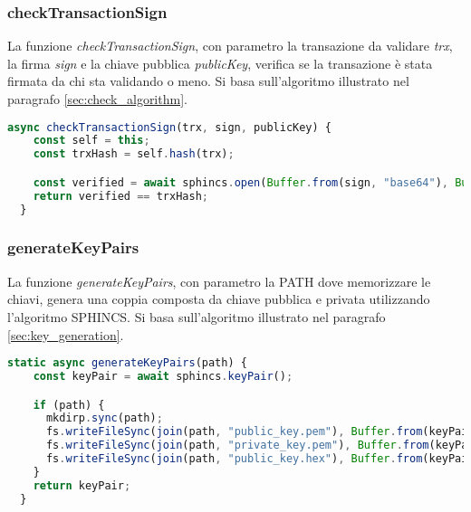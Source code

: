 \subsubsection{checkTransactionSign}
La funzione \textit{checkTransactionSign}, con parametro la transazione da validare \textit{trx}, la firma \textit{sign} e la chiave pubblica \textit{publicKey}, verifica se la transazione è stata firmata da chi sta validando o meno. Si basa sull'algoritmo illustrato nel paragrafo \ref{sec:check_algorithm}.
\\
\begin{lstlisting}[language=JavaScript,breaklines]
  async checkTransactionSign(trx, sign, publicKey) {
    const self = this;
    const trxHash = self.hash(trx);

    const verified = await sphincs.open(Buffer.from(sign, "base64"), Buffer.from(publicKey, 'hex'));
    return verified == trxHash;
  }
\end{lstlisting}

\subsubsection{generateKeyPairs}
La funzione \textit{generateKeyPairs}, con parametro la PATH dove memorizzare le chiavi, genera una coppia composta da chiave pubblica e privata utilizzando l'algoritmo SPHINCS. Si basa sull'algoritmo illustrato nel paragrafo \ref{sec:key_generation}.
\\
\begin{lstlisting}[language=JavaScript,breaklines]
  static async generateKeyPairs(path) {
    const keyPair = await sphincs.keyPair();

    if (path) {
      mkdirp.sync(path);
      fs.writeFileSync(join(path, "public_key.pem"), Buffer.from(keyPair.publicKey).toString('hex'));
      fs.writeFileSync(join(path, "private_key.pem"), Buffer.from(keyPair.privateKey).toString('hex'));
      fs.writeFileSync(join(path, "public_key.hex"), Buffer.from(keyPair.publicKey).toString('hex'));
    }
    return keyPair;
  }
\end{lstlisting}


